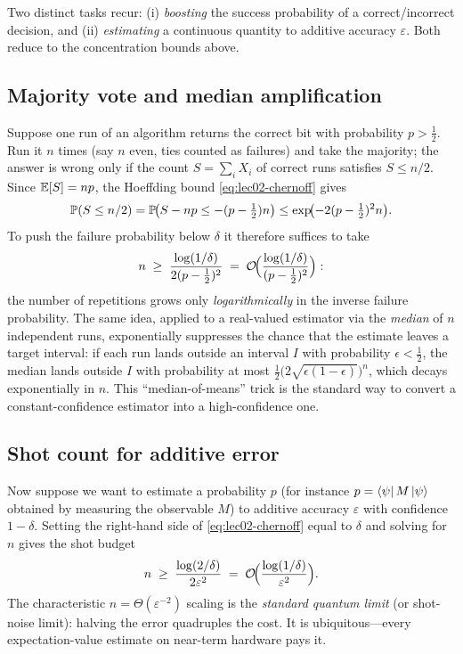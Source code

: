 Two distinct tasks recur: (i) \emph{boosting} the success probability of a
correct/incorrect decision, and (ii) \emph{estimating} a continuous quantity to
additive accuracy $\varepsilon$. Both reduce to the concentration bounds above.

\subsection{Majority vote and median amplification}

Suppose one run of an algorithm returns the correct bit with probability
$p>\tfrac12$. Run it $n$ times (say $n$ even, ties counted as failures) and take
the majority; the answer is wrong only if the count $S=\sum_i X_i$ of correct runs
satisfies $S\le n/2$. Since $\mathbb{E}[S]=np$, the Hoeffding bound
\eqref{eq:lec02-chernoff} gives
\begin{equation}\label{eq:lec02-majority}
  \mathbb{P}(S\le n/2)=\mathbb{P}\!\bigl(S-np\le-(p-\tfrac12)n\bigr)
   \le\exp\!\bigl(-2(p-\tfrac12)^{2}n\bigr).
\end{equation}
To push the failure probability below $\delta$ it therefore suffices to take
\begin{equation}\label{eq:lec02-majoritybudget}
  n\;\ge\;\frac{\log(1/\delta)}{2(p-\tfrac12)^{2}}
     \;=\;\mathcal{O}\!\Bigl(\frac{\log(1/\delta)}{(p-\tfrac12)^{2}}\Bigr):
\end{equation}
the number of repetitions grows only \emph{logarithmically} in the inverse failure
probability. The same idea, applied to a real-valued estimator via the
\emph{median} of $n$ independent runs, exponentially suppresses the chance that the
estimate leaves a target interval: if each run lands outside an interval $I$ with
probability $\epsilon<\tfrac12$, the median lands outside $I$ with probability at
most $\tfrac12\bigl(2\sqrt{\epsilon(1-\epsilon)}\bigr)^{n}$, which decays
exponentially in $n$. This ``median-of-means'' trick is the standard way to convert
a constant-confidence estimator into a high-confidence one.

\subsection{Shot count for additive error}

Now suppose we want to estimate a probability $p$ (for instance
$p=\bra{\psi}M\ket{\psi}$ obtained by measuring the observable $M$) to additive
accuracy $\varepsilon$ with confidence $1-\delta$. Setting the right-hand side of
\eqref{eq:lec02-chernoff} equal to $\delta$ and solving for $n$ gives the shot
budget
\begin{equation}\label{eq:lec02-shots}
  n\;\ge\;\frac{\log(2/\delta)}{2\varepsilon^{2}}
     \;=\;\mathcal{O}\!\Bigl(\frac{\log(1/\delta)}{\varepsilon^{2}}\Bigr).
\end{equation}
The characteristic $n=\Theta(\varepsilon^{-2})$ scaling is the \emph{standard
quantum limit} (or shot-noise limit): halving the error quadruples the cost. It is
ubiquitous---every expectation-value estimate on near-term hardware pays it.

